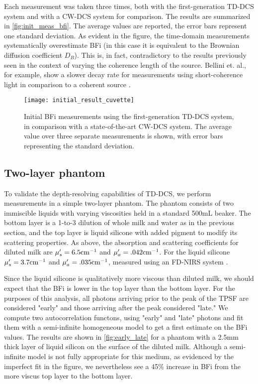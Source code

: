 Each measurement was taken three times, both with the first-generation TD-DCS system and with a CW-DCS system for comparison. The results are summarized in \autoref{fig:init_meas_bfi}. The average values are reported, the error bars represent one standard deviation. As evident in the figure, the time-domain measurements systematically overestimate BFi (in this case it is equivalent to the Brownian diffusion coefficient $D_B$). This is, in fact, contradictory to the results previously seen in the context of varying the coherence length of the source. Bellini et. al., for example, show a slower decay rate for measurements using short-coherence light in comparison to a coherent source \cite{Bellini1991}.

\begin{figure}[tb]
    \centering
    \texttt{[image: initial\_result\_cuvette]}
    \caption{Initial BFi measurements using the first-generation TD-DCS system, in comparison with a state-of-the-art CW-DCS system. The average value over three separate measurements is shown, with error bars representing the standard deviation.}
    \label{fig:init_meas_bfi}
\end{figure}

\subsection{Two-layer phantom} \label{sec:two_layer}
To validate the depth-resolving capabilities of TD-DCS, we perform measurements in a simple two-layer phantom. The phantom consists of two immiscible liquids with varying viscosities held in a standard 500mL beaker. The bottom layer is a 1-to-3 dilution of whole milk and water as in the previous section, and the top layer is liquid silicone with added pigment to modify its scattering properties. As above, the absorption and scattering coefficients for diluted milk are $\mu_s'=6.5 \textnormal{cm}^{-1}$ and $\mu_a'=.042 \textnormal{cm}^{-1}$. For the liquid silicone $\mu_s'=3.7 \textnormal{cm}^{-1}$ and $\mu_a'=.035 \textnormal{cm}^{-1}$, measured using an FD-NIRS system \cite{MetaOx}.

Since the liquid silicone is qualitatively more viscous than diluted milk, we should expect that the BFi is lower in the top layer than the bottom layer. For the purposes of this analysis, all photons arriving prior to the peak of the TPSF are considered "early" and those arriving after the peak considered "late." We compute two autocorrelation functons, using "early" and "late" photons and fit them with a semi-infinite homogeneous model to get a first estimate on the BFi values. The results are shown in \autoref{fig:early_late} for a phantom with a 2.5mm thick layer of liquid silicon on the surface of the diluted milk. Although a semi-infinite model is not fully appropriate for this medium, as evidenced by the imperfect fit in the figure, we nevertheless see a 45\% increase in BFi from the more viscus top layer to the bottom layer.

